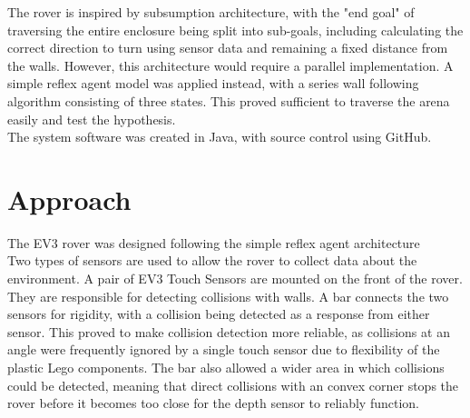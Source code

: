 \documentclass[a4paper,12pt,twocolumn]{article}
\begin{document}
The rover is inspired by subsumption architecture, with the "end goal" of traversing the entire enclosure being split into sub-goals, including calculating the correct direction to turn using sensor data and remaining a fixed distance from the walls. However, this architecture would require a parallel implementation. A simple reflex agent model was applied instead, with a series wall following algorithm consisting of three states. This proved sufficient to traverse the arena easily and test the hypothesis. \\

The system software was created in Java, with source control using GitHub. 
 

\section{Approach}
The EV3 rover was designed following the simple reflex agent architecture  \cite{brooks1991intelligence}\\

Two types of sensors are used to allow the rover to collect data about the environment. A pair of EV3 Touch Sensors are mounted on the front of the rover. They are responsible for detecting collisions with walls. A bar connects the two sensors for rigidity, with a collision being detected as a response from either sensor. This proved to make collision detection more reliable, as collisions at an angle were frequently ignored by a single touch sensor due to flexibility of the plastic Lego components. The bar also allowed a wider area in which collisions could be detected, meaning that direct collisions with an convex corner stops the rover before it becomes too close for the depth sensor to reliably function.\\
\end{document}
